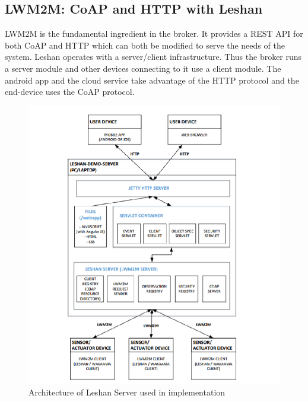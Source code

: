 \subsection{LWM2M: CoAP and HTTP with Leshan}


LWM2M is the fundamental ingredient in the broker. It provides a REST API for both CoAP and HTTP which can both be modified to serve the needs of the system. Leshan operates with a server/client infrastructure. Thus the broker runs a server module and other devices connecting to it use a client module. The android app and the cloud service take advantage of the HTTP protocol and the end-device uses the CoAP protocol.

\begin{figure}[h]
	\begin{center}
		\includegraphics[width=1.3\linewidth]{img/LeshanArc}
		\caption{Architecture of Leshan Server used in implementation} 
		\label{fig:fig3}
	\end{center}
\end{figure}

